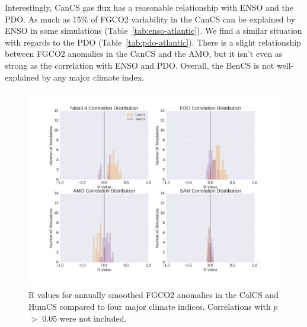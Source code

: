 \documentclass[12pt]{article}
\begin{document}
Interestingly, CanCS gas flux has a reasonable relationship with ENSO and the PDO. As much as 15\% of FGCO2 variability in the CanCS can be explained by ENSO in some simulations (Table~\ref{tab:enso-atlantic}). We find a similar situation with regards to the PDO (Table~\ref{tab:pdo-atlantic}). There is a slight relationship between FGCO2 anomalies in the CanCS and the AMO, but it isn't even as strong as the correlation with ENSO and PDO. Overall, the BenCS is not well-explained by any major climate index.

\begin{figure}[!h]
	\centering
	\includegraphics[width=\linewidth]{../../figs/atlantic/atlantic-EBU-correlation-distributions.png}
	\caption{R values for annually smoothed FGCO2 anomalies in the CalCS and HumCS compared to four major climate indices. Correlations with $p$ $>$ 0.05 were not included.}
	\label{fig:atlantic-histograms}
\end{figure}
\end{document}
